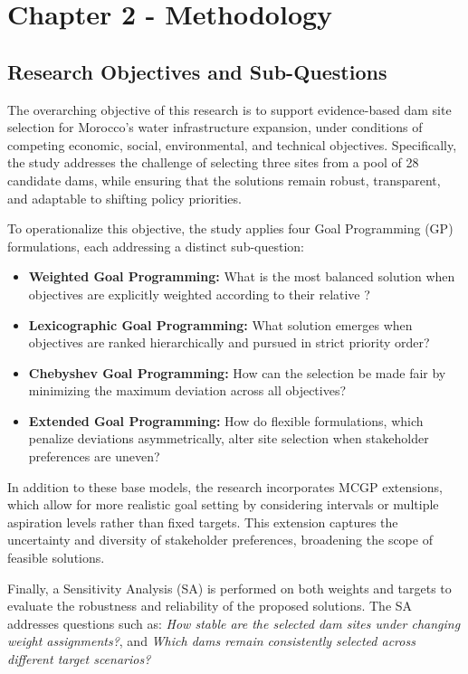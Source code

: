 \section{Chapter 2 - Methodology}\label{sec:methodology}

\subsection*{Research Objectives and Sub-Questions}
\noindent The overarching objective of this research is to support evidence-based dam site selection 
for Morocco's water infrastructure expansion, under conditions of competing 
economic, social, environmental, and technical objectives. Specifically, the study addresses the challenge of selecting three sites from a pool of 28 candidate dams, while ensuring that the solutions remain robust, transparent, and adaptable to shifting policy priorities.

To operationalize this objective, the study applies four Goal Programming (GP) formulations, 
each addressing a distinct sub-question:

\begin{itemize}
    \item \textbf{Weighted Goal Programming:} What is the most balanced solution when 
    objectives are explicitly weighted according to their relative      ?
    \item \textbf{Lexicographic Goal Programming:} What solution emerges when objectives 
    are ranked hierarchically and pursued in strict priority order?
    \item \textbf{Chebyshev Goal Programming:} How can the selection be made fair by 
    minimizing the maximum deviation across all objectives?
    \item \textbf{Extended Goal Programming:} How do flexible formulations, which 
    penalize deviations asymmetrically, alter site selection when stakeholder preferences 
    are uneven?
\end{itemize}

In addition to these base models, the research incorporates \gls{MCGP} extensions, which allow for more realistic goal setting by considering intervals or multiple aspiration levels rather than fixed targets. This extension captures the uncertainty and diversity of stakeholder preferences, broadening the scope of feasible solutions.

Finally, a Sensitivity Analysis (SA) is performed on both weights and targets to 
evaluate the robustness and reliability of the proposed solutions. The SA addresses questions 
such as: \textit{How stable are the selected dam sites under changing weight assignments?}, and \textit{Which dams remain consistently selected across different target scenarios?}

